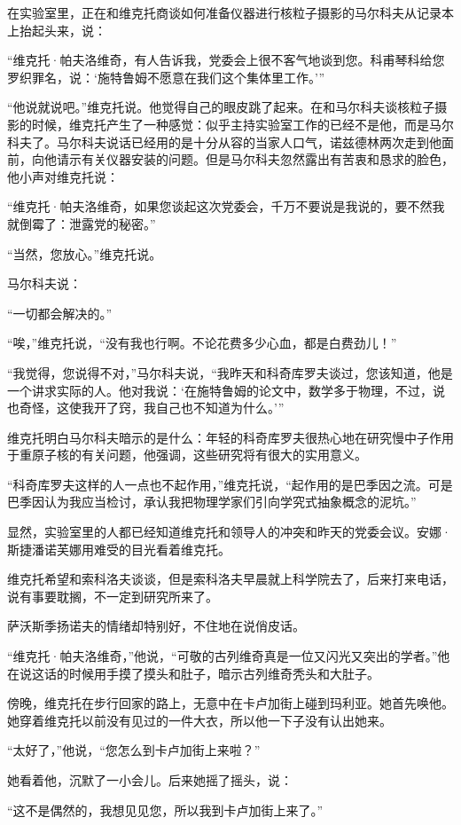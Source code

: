 在实验室里，正在和维克托商谈如何准备仪器进行核粒子摄影的马尔科夫从记录本上抬起头来，说：

“维克托·帕夫洛维奇，有人告诉我，党委会上很不客气地谈到您。科甫琴科给您罗织罪名，说：‘施特鲁姆不愿意在我们这个集体里工作。’”

“他说就说吧。”维克托说。他觉得自己的眼皮跳了起来。在和马尔科夫谈核粒子摄影的时候，维克托产生了一种感觉：似乎主持实验室工作的已经不是他，而是马尔科夫了。马尔科夫说话已经用的是十分从容的当家人口气，诺兹德林两次走到他面前，向他请示有关仪器安装的问题。但是马尔科夫忽然露出有苦衷和恳求的脸色，他小声对维克托说：

“维克托·帕夫洛维奇，如果您谈起这次党委会，千万不要说是我说的，要不然我就倒霉了：泄露党的秘密。”

“当然，您放心。”维克托说。

马尔科夫说：

“一切都会解决的。”

“唉，”维克托说，“没有我也行啊。不论花费多少心血，都是白费劲儿！”

“我觉得，您说得不对，”马尔科夫说，“我昨天和科奇库罗夫谈过，您该知道，他是一个讲求实际的人。他对我说：‘在施特鲁姆的论文中，数学多于物理，不过，说也奇怪，这使我开了窍，我自己也不知道为什么。’”

维克托明白马尔科夫暗示的是什么：年轻的科奇库罗夫很热心地在研究慢中子作用于重原子核的有关问题，他强调，这些研究将有很大的实用意义。

“科奇库罗夫这样的人一点也不起作用，”维克托说，“起作用的是巴季因之流。可是巴季因认为我应当检讨，承认我把物理学家们引向学究式抽象概念的泥坑。”

显然，实验室里的人都已经知道维克托和领导人的冲突和昨天的党委会议。安娜·斯捷潘诺芙娜用难受的目光看着维克托。

维克托希望和索科洛夫谈谈，但是索科洛夫早晨就上科学院去了，后来打来电话，说有事要耽搁，不一定到研究所来了。

萨沃斯季扬诺夫的情绪却特别好，不住地在说俏皮话。

“维克托·帕夫洛维奇，”他说，“可敬的古列维奇真是一位又闪光又突出的学者。”他在说这话的时候用手摸了摸头和肚子，暗示古列维奇秃头和大肚子。

傍晚，维克托在步行回家的路上，无意中在卡卢加街上碰到玛利亚。她首先唤他。她穿着维克托以前没有见过的一件大衣，所以他一下子没有认出她来。

“太好了，”他说，“您怎么到卡卢加街上来啦？”

她看着他，沉默了一小会儿。后来她摇了摇头，说：

“这不是偶然的，我想见见您，所以我到卡卢加街上来了。”

